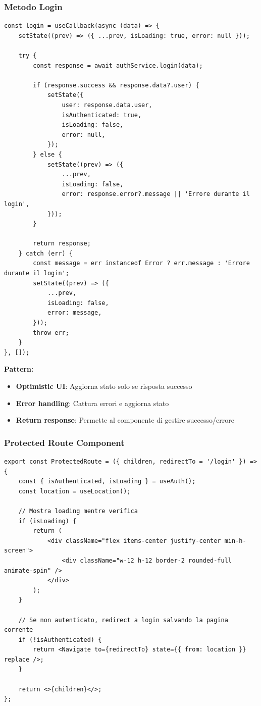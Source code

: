 \documentclass[11pt,a4paper]{article}
\begin{document}
\subsubsection{Metodo Login}

\begin{lstlisting}[caption=Metodo Login nel Context]
const login = useCallback(async (data) => {
    setState((prev) => ({ ...prev, isLoading: true, error: null }));

    try {
        const response = await authService.login(data);

        if (response.success && response.data?.user) {
            setState({
                user: response.data.user,
                isAuthenticated: true,
                isLoading: false,
                error: null,
            });
        } else {
            setState((prev) => ({
                ...prev,
                isLoading: false,
                error: response.error?.message || 'Errore durante il login',
            }));
        }

        return response;
    } catch (err) {
        const message = err instanceof Error ? err.message : 'Errore durante il login';
        setState((prev) => ({
            ...prev,
            isLoading: false,
            error: message,
        }));
        throw err;
    }
}, []);
\end{lstlisting}

\textbf{Pattern:}
\begin{itemize}
    \item \textbf{Optimistic UI}: Aggiorna stato solo se risposta successo
    \item \textbf{Error handling}: Cattura errori e aggiorna stato
    \item \textbf{Return response}: Permette al componente di gestire successo/errore
\end{itemize}

\subsubsection{Protected Route Component}

\begin{lstlisting}[caption=Componente Protected Route]
export const ProtectedRoute = ({ children, redirectTo = '/login' }) => {
    const { isAuthenticated, isLoading } = useAuth();
    const location = useLocation();

    // Mostra loading mentre verifica
    if (isLoading) {
        return (
            <div className="flex items-center justify-center min-h-screen">
                <div className="w-12 h-12 border-2 rounded-full animate-spin" />
            </div>
        );
    }

    // Se non autenticato, redirect a login salvando la pagina corrente
    if (!isAuthenticated) {
        return <Navigate to={redirectTo} state={{ from: location }} replace />;
    }

    return <>{children}</>;
};
\end{lstlisting}
\end{document}
